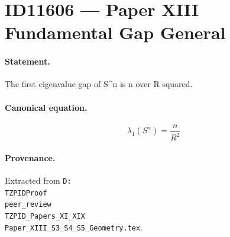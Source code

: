 \section*{ID11606 --- Paper XIII Fundamental Gap General}

\paragraph{Statement.}
The first eigenvalue gap of S^n is n over R squared.

\paragraph{Canonical equation.}
\[
\lambda_1(S^n)=\frac{n}{R^2}
\]

\paragraph{Provenance.}
Extracted from \texttt{D:\\TZPIDProof\\peer\_review\\TZPID\_Papers\_XI\_XIX\\Paper\_XIII\_S3\_S4\_S5\_Geometry.tex}.
